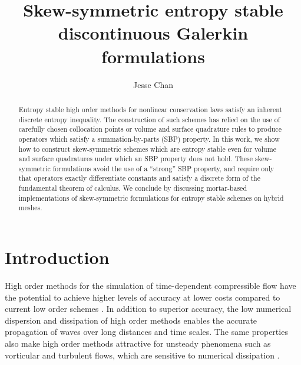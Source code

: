 \documentclass[review]{siamart0216}
\date{}
\author{Jesse Chan}%
\title{Skew-symmetric entropy stable discontinuous Galerkin formulations}
\theoremstyle{assumption}
\begin{document}
\maketitle

\begin{abstract}
Entropy stable high order methods for nonlinear conservation laws satisfy an inherent discrete entropy inequality.  The construction of such schemes has relied on the use of carefully chosen collocation points \cite{gassner2013skew, fisher2013high, carpenter2014entropy, chan2018efficient} or volume and surface quadrature rules \cite{chan2017discretely, chan2018discretely} to produce operators which satisfy a summation-by-parts (SBP) property.  In this work, we show how to construct skew-symmetric schemes which are entropy stable even for volume and surface quadratures under which an SBP property does not hold.  These skew-symmetric formulations avoid the use of a ``strong'' SBP property, and require only that operators exactly differentiate constants and satisfy a discrete form of the fundamental theorem of calculus.   We conclude by discussing mortar-based implementations of skew-symmetric formulations for entropy stable schemes on hybrid meshes. 
\end{abstract}


\section{Introduction}

High order methods for the simulation of time-dependent compressible flow have the potential to achieve higher levels of accuracy at lower costs compared to current low order schemes \cite{wang2013high}.  In addition to superior accuracy, %
the low numerical dispersion and dissipation of high order methods \cite{ainsworth2004dispersive} enables the accurate propagation of waves over long distances and time scales.  The same properties also make high order methods attractive for unsteady phenomena such as vorticular and turbulent flows, which are sensitive to numerical dissipation \cite{visbal1999high, wang2013high}.  
\end{document}
